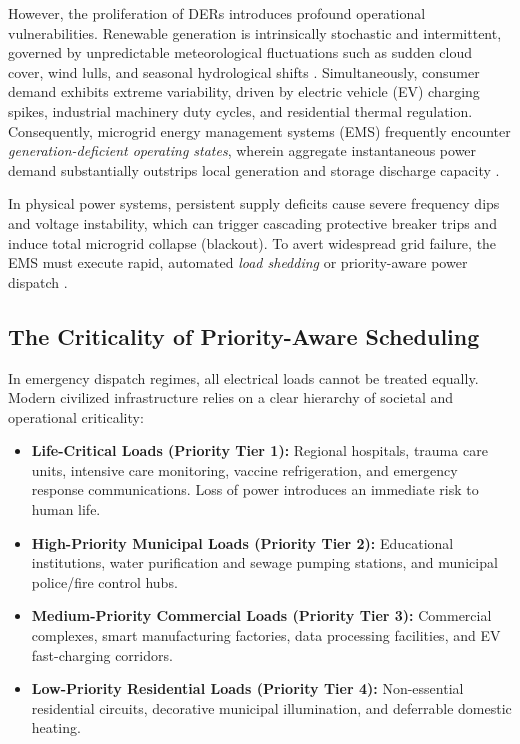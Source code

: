 \documentclass[11pt,a4paper]{article}
\theoremstyle{definition}
\theoremstyle{remark}
\begin{document}
However, the proliferation of DERs introduces profound operational vulnerabilities. Renewable generation is intrinsically stochastic and intermittent, governed by unpredictable meteorological fluctuations such as sudden cloud cover, wind lulls, and seasonal hydrological shifts \cite{thirunavukkarasu2022}. Simultaneously, consumer demand exhibits extreme variability, driven by electric vehicle (EV) charging spikes, industrial machinery duty cycles, and residential thermal regulation. Consequently, microgrid energy management systems (EMS) frequently encounter \textit{generation-deficient operating states}, wherein aggregate instantaneous power demand substantially outstrips local generation and storage discharge capacity \cite{liu2023}.

In physical power systems, persistent supply deficits cause severe frequency dips and voltage instability, which can trigger cascading protective breaker trips and induce total microgrid collapse (blackout). To avert widespread grid failure, the EMS must execute rapid, automated \textit{load shedding} or priority-aware power dispatch \cite{sharma2022}.

\subsection{The Criticality of Priority-Aware Scheduling}
In emergency dispatch regimes, all electrical loads cannot be treated equally. Modern civilized infrastructure relies on a clear hierarchy of societal and operational criticality:
\begin{itemize}
    \item \textbf{Life-Critical Loads (Priority Tier 1):} Regional hospitals, trauma care units, intensive care monitoring, vaccine refrigeration, and emergency response communications. Loss of power introduces an immediate risk to human life.
    \item \textbf{High-Priority Municipal Loads (Priority Tier 2):} Educational institutions, water purification and sewage pumping stations, and municipal police/fire control hubs.
    \item \textbf{Medium-Priority Commercial Loads (Priority Tier 3):} Commercial complexes, smart manufacturing factories, data processing facilities, and EV fast-charging corridors.
    \item \textbf{Low-Priority Residential Loads (Priority Tier 4):} Non-essential residential circuits, decorative municipal illumination, and deferrable domestic heating.
\end{itemize}
\end{document}
